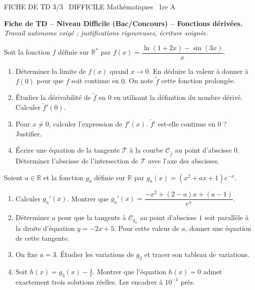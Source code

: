 \documentclass[11pt]{article}
\begin{document}
\begin{tcolorbox}[enhanced,colback=popink,colframe=popink,arc=10pt,boxrule=0pt,left=12pt,right=12pt,top=9pt,bottom=9pt]
{\color{white}\popxbold\small FICHE DE TD 3/3 \textbullet\ DIFFICILE \hfill Mathématiques \textbullet\ 1re A\par}
\end{tcolorbox}
\vspace{4pt}
\noindent \textbf{Fiche de TD -- Niveau Difficile (Bac/Concours) -- Fonctions dérivées.} \textit{Travail autonome exigé ; justifications rigoureuses, écriture soignée.}

\begin{exercice}
Soit la fonction $f$ définie sur $\mathbb{R}^*$ par $f(x) = \dfrac{\ln(1+2x) - \sin(3x)}{x}$.
\begin{enumerate}
    \item Déterminer la limite de $f(x)$ quand $x \to 0$. En déduire la valeur à donner à $f(0)$ pour que $f$ soit continue en $0$. On note $\tilde{f}$ cette fonction prolongée.
    \item Étudier la dérivabilité de $\tilde{f}$ en $0$ en utilisant la définition du nombre dérivé. Calculer $\tilde{f}'(0)$.
    \item Pour $x \neq 0$, calculer l'expression de $f'(x)$. $\tilde{f}'$ est-elle continue en $0$ ? Justifier.
    \item Écrire une équation de la tangente $\mathcal{T}$ à la courbe $\mathcal{C}_{\tilde{f}}$ au point d'abscisse $0$. Déterminer l'abscisse de l'intersection de $\mathcal{T}$ avec l'axe des abscisses.
\end{enumerate}
\end{exercice}

\begin{exercice}
Soient $a \in \mathbb{R}$ et la fonction $g_a$ définie sur $\mathbb{R}$ par $g_a(x) = (x^2 + ax + 1)e^{-x}$.
\begin{enumerate}
    \item Calculer $g_a'(x)$. Montrer que $g_a'(x) = \dfrac{-x^2 + (2-a)x + (a-1)}{e^x}$.
    \item Déterminer $a$ pour que la tangente à $\mathcal{C}_{g_a}$ au point d'abscisse $1$ soit parallèle à la droite d'équation $y = -2x + 5$. Pour cette valeur de $a$, donner une équation de cette tangente.
    \item On fixe $a = 3$. Étudier les variations de $g_3$ et tracer son tableau de variations.
    \item Soit $h(x) = g_3(x) - \frac{4}{e}$. Montrer que l'équation $h(x) = 0$ admet exactement trois solutions réelles. Les encadrer à $10^{-1}$ près.
\end{enumerate}
\end{exercice}
\end{document}
